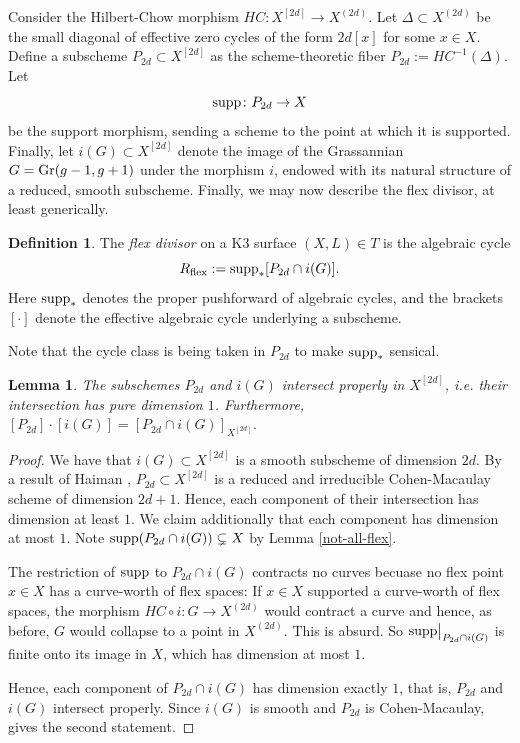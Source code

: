 \documentclass{amsart}
\newtheorem{lemma}[theorem]{Lemma}
\theoremstyle{definition}
\newtheorem{definition}[theorem]{Definition}
\begin{document}
Consider the Hilbert-Chow morphism $HC\colon X^{[2d]}\to X^{(2d)}$. Let 
$\Delta\subset X^{(2d)}$ be the small diagonal of effective zero cycles of the form $
2d[x]$ for some $x\in X$. Define a subscheme $P_{2d}\subset X^{[2d]}$
as the scheme-theoretic fiber $P_{2d}:=HC^{-1}(\Delta).$
Let $${\rm supp}\colon P_{2d}\to X$$ be the support morphism, sending
a scheme to the point at which it is supported. Finally,
let $i(G)\subset X^{[2d]}$ denote the image of the Grassannian
$G={\rm Gr}(g-1,g+1)$ under the morphism $i$, endowed with
its natural structure of a reduced, smooth subscheme. Finally,
we may now describe the flex divisor, at least generically.


\begin{definition} 
The {\it flex divisor} on a K3 surface $(X,L)\in T$
is the algebraic cycle
$$R_{\rm flex}:={\rm supp}_*[P_{2d}\cap i(G)].$$ Here
${\rm supp}_*$ denotes the proper pushforward of algebraic
cycles, and the brackets $[\cdot]$ denote the 
effective algebraic cycle underlying a subscheme.
 \end{definition}
 
 Note that the cycle class is being taken in $P_{2d}$ to make ${\rm supp}_*$
 sensical.
 
\begin{lemma}\label{equidim-flex} The subschemes $P_{2d}$ and $i(G)$ intersect
properly in $X^{[2d]}$, i.e. their intersection has pure dimension $1$. Furthermore,
$[P_{2d}]\cdot [i(G)]=[P_{2d}\cap i(G)]_{X^{[2d]}}.$ 
\end{lemma}

\begin{proof} We have that $i(G)\subset X^{[2d]}$ is a smooth subscheme
of dimension $2d$. By a result of Haiman \cite[Prop.~2.10]{haiman1998t},
$P_{2d}\subset  X^{[2d]}$
is a reduced and irreducible 
Cohen-Macaulay scheme of dimension $2d+1$.
Hence, each component of their intersection has dimension
at least $1$. We claim additionally that each
component has dimension at most $1$.
Note ${\rm supp}(P_{2d}\cap i(G))\subsetneq X$ by Lemma \ref{not-all-flex}. 

The restriction of ${\rm supp}$ to $P_{2d}\cap i(G)$ contracts no curves
becuase no flex point $x\in X$ has a curve-worth of flex spaces:
If $x\in X$ supported a curve-worth of flex spaces, the morphism $HC\circ i :G\to X^{(2d)}$ would
contract a curve and hence, as before, $G$ would collapse
to a point in $X^{(2d)}$. This is absurd. So ${\rm supp}\big{|}_{P_{2d}\cap i(G)}$
is finite onto its image in $X$, which has dimension at most $1$.

Hence, each component of $P_{2d}\cap i(G)$
has dimension exactly $1$, that is,
$P_{2d}$ and $i(G)$ intersect properly.
Since $i(G)$ is smooth and $P_{2d}$ is Cohen-Macaulay,
\cite[Prop.~7.1]{fulton2016intersection}
gives the second statement.
\end{proof}
\end{document}
